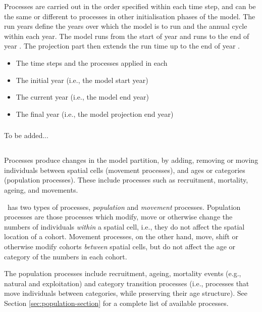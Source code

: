 Processes are carried out in the order specified within each time step, and can be the same or different to processes in other initialisation phases of the model. The run years define the years over which the model is to run and the annual cycle within each year. The model runs from the start of year  and runs to the end of year . The projection part then extends the run time up to the end of year . 

\begin{itemize}
  \item The time steps and the processes applied in each
  \item The initial year (i.e., the model start year)
  \item The current year (i.e., the model end year)
  \item The final year (i.e., the model projection end year)
\end{itemize}

\subsubsection{}

To be added...

\subsection{}

Processes produce changes in the model partition, by adding, removing or moving individuals between spatial cells (movement processes), and ages or categories (population processes). These include processes such as recruitment, mortality, ageing, and movements.

\SPM\ has two types of processes, \emph{population} and \emph{movement} processes. Population processes are those processes which modify, move or otherwise change the numbers of individuals \emph{within} a spatial cell, i.e., they do not affect the spatial location of a cohort. Movement processes, on the other hand, move, shift or otherwise modify cohorts \emph{between} spatial cells, but do not affect the age or category of the numbers in each cohort. 

The population processes include recruitment, ageing,  mortality events (e.g., natural and exploitation) and category transition processes (i.e., processes that move individuals between categories, while preserving their age structure). See Section \ref{sec:population-section} for a complete list of available processes.

